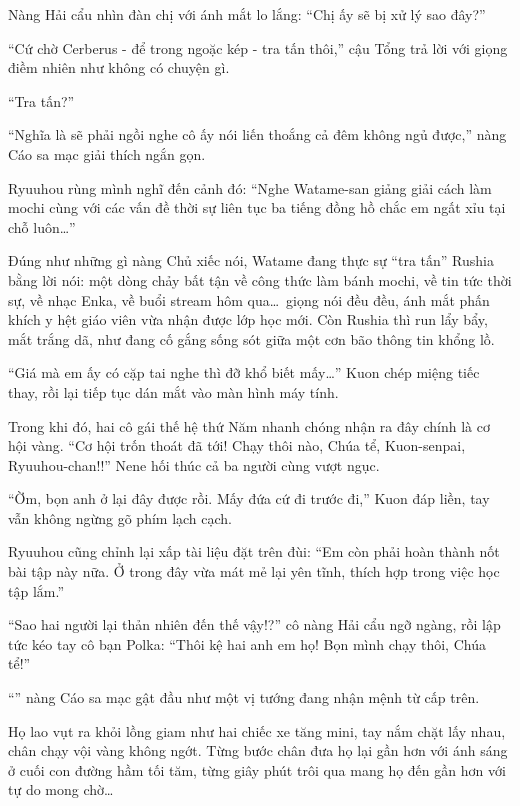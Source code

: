 \documentclass[../main.tex]{subfiles}
\begin{document}

Nàng Hải cẩu nhìn đàn chị với ánh mắt lo lắng: ``Chị ấy sẽ bị xử lý sao đây?''

``Cứ chờ Cerberus - để trong ngoặc kép - tra tấn thôi,'' cậu Tổng trả lời với giọng điềm nhiên như không có chuyện gì.

``Tra tấn?''

``Nghĩa là sẽ phải ngồi nghe cô ấy nói liến thoắng cả đêm không ngủ được,'' nàng Cáo sa mạc giải thích ngắn gọn.

Ryuuhou rùng mình nghĩ đến cảnh đó: ``Nghe Watame-san giảng giải cách làm mochi cùng với các vấn đề thời sự liên tục ba tiếng đồng hồ chắc em ngất xỉu tại chỗ luôn\dots''

Đúng như những gì nàng Chủ xiếc nói, Watame đang thực sự ``tra tấn'' Rushia bằng lời nói: một dòng chảy bất tận về công thức làm bánh mochi, về tin tức thời sự, về nhạc Enka, về buổi stream hôm qua\dots\ giọng nói đều đều, ánh mắt phấn khích y hệt giáo viên vừa nhận được lớp học mới. Còn Rushia thì run lẩy bẩy, mắt trắng dã, như đang cố gắng sống sót giữa một cơn bão thông tin khổng lồ.


``Giá mà em ấy có cặp tai nghe thì đỡ khổ biết mấy\dots'' Kuon chép miệng tiếc thay, rồi lại tiếp tục dán mắt vào màn hình máy tính.

Trong khi đó, hai cô gái thế hệ thứ Năm nhanh chóng nhận ra đây chính là cơ hội vàng. ``Cơ hội trốn thoát đã tới! Chạy thôi nào, Chúa tể, Kuon-senpai, Ryuuhou-chan!!'' Nene hối thúc cả ba người cùng vượt ngục.

``Ờm, bọn anh ở lại đây được rồi. Mấy đứa cứ đi trước đi,'' Kuon đáp liền, tay vẫn không ngừng gõ phím lạch cạch.

Ryuuhou cũng chỉnh lại xấp tài liệu đặt trên đùi: ``Em còn phải hoàn thành nốt bài tập này nữa. Ở trong đây vừa mát mẻ lại yên tĩnh, thích hợp trong việc học tập lắm.''

``Sao hai người lại thản nhiên đến thế vậy!?'' cô nàng Hải cẩu ngỡ ngàng, rồi lập tức kéo tay cô bạn Polka: ``Thôi kệ hai anh em họ! Bọn mình chạy thôi, Chúa tể!''

``'' nàng Cáo sa mạc gật đầu như một vị tướng đang nhận mệnh từ cấp trên.

Họ lao vụt ra khỏi lồng giam như hai chiếc xe tăng mini, tay nắm chặt lấy nhau, chân chạy vội vàng không ngớt. Từng bước chân đưa họ lại gần hơn với ánh sáng ở cuối con đường hầm tối tăm, từng giây phút trôi qua mang họ đến gần hơn với tự do mong chờ\dots
\end{document}
